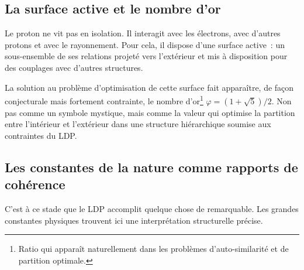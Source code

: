 \documentclass[12pt, a4paper, openright]{book}
\begin{document}
\subsection*{La surface active et le nombre d'or}

Le proton ne vit pas en isolation. Il interagit avec les électrons, avec d'autres protons et avec le rayonnement. Pour cela, il dispose d'une surface active~: un sous-ensemble de ses relations projeté vers l'extérieur et mis à disposition pour des couplages avec d'autres structures.

\medskip

La solution au problème d'optimisation de cette surface fait apparaître, de façon conjecturale mais fortement contrainte, le nombre d'or\footnote{Ratio qui apparaît naturellement dans les problèmes d'auto-similarité et de partition optimale.} $\varphi = (1+\sqrt{5})/2$. Non pas comme un symbole mystique, mais comme la valeur qui optimise la partition entre l'intérieur et l'extérieur dans une structure hiérarchique soumise aux contraintes du LDP.

\subsection*{Les constantes de la nature comme rapports de cohérence}

C'est à ce stade que le LDP accomplit quelque chose de remarquable. Les grandes constantes physiques trouvent ici une interprétation structurelle précise.

\medskip
\end{document}
